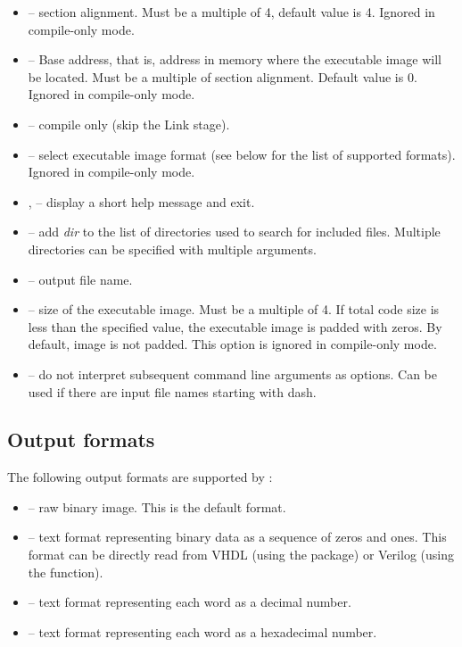 \documentclass[a4paper,12pt,twoside,extrafontsizes]{memoir}
\begin{document}
\begin{itemize}
	\item {} -- section alignment. Must be a multiple of 4, default value is 4. Ignored in compile-only mode.
	
	\item {} -- Base address, that is, address in memory where the executable image will be located. Must be a multiple of section alignment. Default value is 0. Ignored in compile-only mode.
	
	\item {} -- compile only (skip the Link stage).
	
	\item {} -- select executable image format (see below for the list of supported formats). Ignored in compile-only mode.
	
	\item {},  -- display a short help message and exit.
	
	\item {} -- add \emph{dir} to the list of directories used to search for included files. Multiple directories can be specified with multiple  arguments.
	
	\item {} -- output file name.
	
	\item {} -- size of the executable image. Must be a multiple of 4. If total code size is less than the specified value, the executable image is padded with zeros. By default, image is not padded. This option is ignored in compile-only mode.
	
	\item \shellcmd{--} -- do not interpret subsequent command line arguments as options. Can be used if there are input file names starting with dash.
\end{itemize}

\subsection{Output formats}

The following output formats are supported by :

\begin{itemize}
	\item {} -- raw binary image. This is the default format.
	\item {} -- text format representing binary data as a sequence of zeros and ones. This format can be directly read from VHDL (using the  package) or Verilog\textregistered{} (using the  function).
	\item {} -- text format representing each word as a decimal number.
	\item {} -- text format representing each word as a hexadecimal number.
\end{itemize}
\end{document}
